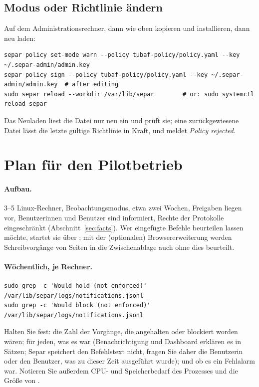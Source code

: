 \documentclass[11pt,a4paper]{article}
\begin{document}
\subsection{Modus oder Richtlinie ändern}
Auf dem Administrationsrechner, dann wie oben kopieren und installieren, dann neu laden:
\begin{lstlisting}
separ policy set-mode warn --policy tubaf-policy/policy.yaml --key ~/.separ-admin/admin.key
separ policy sign --policy tubaf-policy/policy.yaml --key ~/.separ-admin/admin.key  # after editing
sudo separ reload --workdir /var/lib/separ        # or: sudo systemctl reload separ
\end{lstlisting}
Das Neuladen liest die Datei nur neu ein und prüft sie; eine zurückgewiesene Datei lässt die
letzte gültige Richtlinie in Kraft, und  meldet \emph{Policy rejected}.

\section{Plan für den Pilotbetrieb}
\label{sec:pilot}

\paragraph{Aufbau.} 3--5 Linux-Rechner, Beobachtungsmodus, etwa zwei Wochen, Freigaben liegen vor,
Benutzerinnen und Benutzer sind informiert, Rechte der Protokolle eingeschränkt
(Abschnitt~\ref{sec:facts}). Wer eingefügte Befehle beurteilen lassen möchte, startet sie über
; mit der (optionalen) Browsererweiterung werden Schreibvorgänge von
Seiten in die Zwischenablage auch ohne dies beurteilt.

\paragraph{Wöchentlich, je Rechner.}
\begin{lstlisting}
sudo grep -c 'Would hold (not enforced)'  /var/lib/separ/logs/notifications.jsonl
sudo grep -c 'Would block (not enforced)' /var/lib/separ/logs/notifications.jsonl
\end{lstlisting}
Halten Sie fest: die Zahl der Vorgänge, die angehalten oder blockiert worden wären; für jeden, was
es war (Benachrichtigung und Dashboard erklären es in Sätzen; Separ speichert den Befehlstext nicht,
fragen Sie daher die Benutzerin oder den Benutzer, was zu dieser Zeit ausgeführt wurde); und ob es
ein Fehlalarm war. Notieren Sie außerdem CPU- und Speicherbedarf des Prozesses  und die
Größe von .
\end{document}

